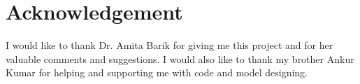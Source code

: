 \documentclass[../main.tex]{subfiles}
\begin{document}
\section{Acknowledgement}
I would like to thank  Dr. Amita Barik for giving me this project and
for her valuable comments and suggestions. I would also like to thank
my brother Ankur Kumar for helping and supporting me with code and model
designing.
\end{document}
